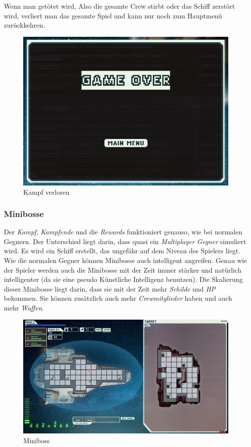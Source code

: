 \documentclass[fontsize=12pt,paper=a4,twoside]{scrartcl}
\begin{document}
Wenn man getötet wird, Also die gesamte Crew stirbt oder das Schiff zerstört wird, verliert man das gesamte Spiel und kann nur noch zum Hauptmenü zurückkehren. 

\begin{figure}[H]
\centering
\includegraphics[width=1\linewidth]{DasSpiel/Kampf/fightlose.png}
\caption{Kampf verloren}
\end{figure}

\subsubsection{Minibosse}

Der \textit{Kampf}, \textit{Kampfende} und die \textit{Rewards} funktioniert genauso, wie bei normalen Gegnern. Der Unterschied liegt darin, dass quasi ein \textit{Multiplayer Gegner} simuliert wird. Es wird ein Schiff erstellt, das ungefähr auf dem Niveau des Spielers liegt. Wie die normalen Gegner können Minibosse auch intelligent angreifen. Genau wie der Spieler werden auch die Minibosse mit der Zeit immer stärker und natürlich intelligenter (da sie eine pseudo Künstliche Intelligenz benutzen). Die Skalierung dieser Minibosse liegt darin, dass sie mit der Zeit mehr \textit{Schilde} und \textit{HP} bekommen. Sie können zusätzlich auch mehr \textit{Crewmitglieder} haben und auch mehr \textit{Waffen}. 

\begin{figure}[H]
\centering
\includegraphics[width=1\linewidth]{DasSpiel/Kampf/miniboss.png}
\caption{Miniboss}
\end{figure}
\end{document}
